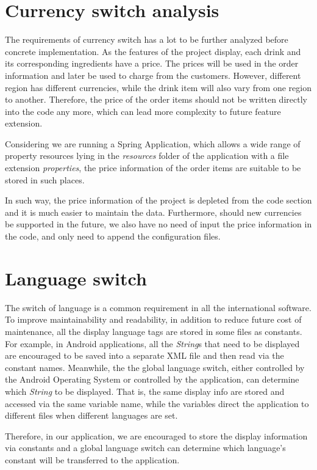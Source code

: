 \documentclass[a4paper]{report}
\begin{document}
\section{Currency switch analysis}
The requirements of currency switch has a lot to be further analyzed before concrete implementation. As the features of the project display, each drink and its corresponding ingredients have a price. The prices will be used in the order information and later be used to charge from the customers. However, different region has different currencies, while the drink item will also vary from one region to another. Therefore, the price of the order items should not be written directly into the code any more, which can lead more complexity to future feature extension. 
\par
Considering we are running a Spring Application, which allows a wide range of property resources lying in the \emph{resources} folder of the application with a file extension \emph{properties}, the price information of the order items are suitable to be stored in such places. 
\par
In such way, the price information of the project is depleted from the code section and it is much easier to maintain the data. Furthermore, should new currencies be supported in the future, we also have no need of input the price information in the code, and only need to append the configuration files.
\section{Language switch}
The switch of language is a common requirement in all the international software. To improve maintainability and readability, in addition to reduce future cost of maintenance, all the display language tags are stored in some files as constants. For example, in Android applications, all the \emph{String}s that need to be displayed are encouraged to be saved into a separate XML file and then read via the constant names. Meanwhile, the the global language switch, either controlled by the Android Operating System or controlled by the application, can determine which \emph{String} to be displayed. That is, the same display info are stored and accessed via the same variable name, while the variables direct the application to different files when different languages are set. 
\par
Therefore, in our application, we are encouraged to store the display information via constants and a global language switch can determine which language's constant will be transferred to the application.
\end{document}
